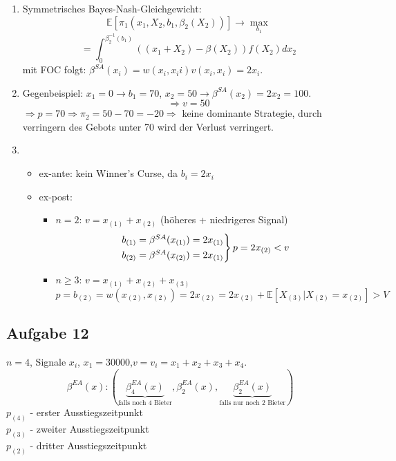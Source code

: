 \documentclass[12pt]{extreport} %
\theoremstyle{named}
\theoremstyle{itshape}
\theoremstyle{normal}
\begin{document}
\begin{enumerate}[label=\alph*\upshape)]
	\item Symmetrisches Bayes-Nash-Gleichgewicht:
		$$ \mathds{E}[\pi_{1}\left( x_1, X_2, b_1, \beta_{2}(X_2)\right)] \longrightarrow \max_{b_{1}}  $$
		$$ = \int_{0}^{\beta_{2}^{-1}(b_{1})} \left( (x_1 + X_2) - \beta\left(X_{2}\right) \right)f(X_2) dx_2 $$
		mit FOC folgt: $\beta^{SA}(x_{i}) = w(x_i, x_ii) v(x_i, x_i) = 2x_i$.
	\item Gegenbeispiel: $x_1 = 0 \rightarrow b_1 = 70$, $x_2 = 50 \rightarrow \beta^{SA}(x_2) = 2x_2 = 100$.
		$$ \Rightarrow v = 50 $$
		$\Rightarrow p = 70 \Rightarrow \pi_2 = 50 - 70 = -20 \Rightarrow$ keine dominante Strategie, durch verringern des Gebots unter 70 wird der Verlust verringert.
	\item \begin{itemize}
		\item ex-ante: kein Winner's Curse, da $b_i = 2 x_i$
		\item ex-post: 
			\begin{itemize}
				\item $n = 2$: $v = x_{(1)} + x_{(2)}$ (höheres + niedrigeres Signal)
					$$ \begin{rcases}
						b_{(1)} = \beta^{SA}(x_{(1)}) = 2x_{(1)} \\
						b_{(2)} = \beta^{SA}(x_{(2)}) = 2x_{(1)}
					\end{rcases} p = 2x_{(2)} < v$$
				\item $n \geq 3$: $v = x_{(1)} + x_{(2)} + x_{(3)}$
					$$ p = b_{(2)} = w\left( x_{(2)}, x_{(2)} \right) = 2x_{(2)} = 2x_{(2)} + \mathds{E}\left[ X_{(3)} \big| X_{(2)} = x_{(2)} \right] > V $$
			\end{itemize}
	\end{itemize}
\end{enumerate}


\subsection*{Aufgabe 12}
$n = 4$, Signale $x_{i}$, $x_{1} = 30000$,$v = v_{i} = x_1 + x_2 + x_3 + x_4$.
$$ \beta^{EA}(x) : \left( \underbrace{\beta_{4}^{EA}(x)}_{\text{falls noch 4 Bieter}}, \beta_{2}^{EA}(x), \underbrace{\beta_{2}^{EA}(x)}_{\text{falls nur noch 2 Bieter}} \right) $$
$p_{(4)}$ - erster Ausstiegszeitpunkt ~\\
$p_{(3)}$ - zweiter Ausstiegszeitpunkt ~\\
$p_{(2)}$ - dritter Ausstiegszeitpunkt ~\\
\end{document}
